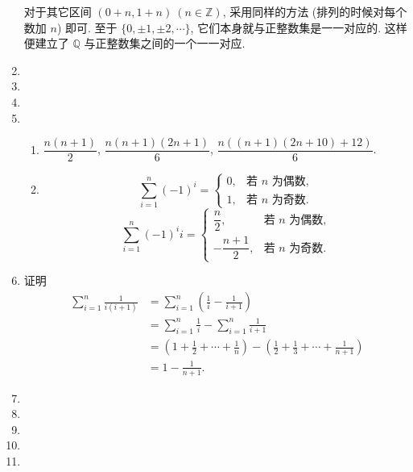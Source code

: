 \documentclass[a4paper, 11pt]{ctexart}
\begin{document}
\begin{enumerate}
            对于其它区间 $(0 + n, 1 + n)\ (n \in \mathbb{Z})$, 采用同样的方法 (排列的时候对每个数加 $n$) 即可. 至于 $\{0, \pm1, \pm2, \cdots\}$, 它们本身就与正整数集是一一对应的.
            这样便建立了 $\mathbb{Q}$ 与正整数集之间的一个一一对应.
        \item %
        \item %
        \item %
        \item %
            \begin{enumerate}[(1)]
                \item %
                    $\dfrac{n(n+1)}{2}$, $\dfrac{n(n+1)(2n+1)}{6}$, $\dfrac{n((n+1)(2n+10) + 12)}{6}$.
                \item %
                    \[
                        \sum_{i=1}^n(-1)^i =
                        \begin{cases}
                            0, & \text{若 $n$ 为偶数}, \\
                            1, & \text{若 $n$ 为奇数}.
                        \end{cases}    
                    \]
                    \[
                        \sum_{i=1}^n(-1)^ii =
                        \begin{cases}
                            \dfrac{n}{2}, & \text{若 $n$ 为偶数}, \\
                            -\dfrac{n+1}{2}, & \text{若 $n$ 为奇数}.
                        \end{cases}    
                    \]
            \end{enumerate}
        \item %
            {\heiti 证明}\quad \begin{align*}
                \sum_{i=1}^n\frac{1}{i(i+1)} &= \sum_{i=1}^n\left(\frac1i - \frac{1}{i+1}\right) \\
                                             &= \sum_{i=1}^n\frac1i - \sum_{i=1}^n\frac{1}{i+1} \\
                                             &= \left(1 + \frac12 + \cdots + \frac1n\right) - \left(\frac12 + \frac13 + \cdots + \frac{1}{n+1}\right) \\
                                             &= 1 - \frac{1}{n+1}.
            \end{align*}
        \item %
        \item %
        \item %
        \item %
        \item %
    \end{enumerate}
\end{document}
